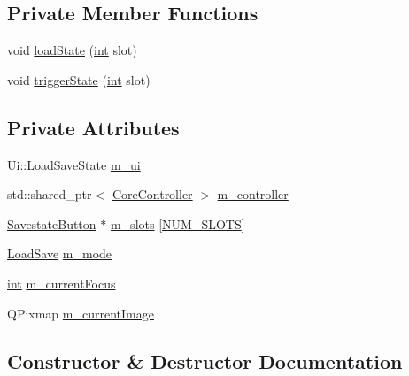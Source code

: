\subsection*{Private Member Functions}
\begin{DoxyCompactItemize}
\item 
void \mbox{\hyperlink{class_q_g_b_a_1_1_load_save_state_a4c71c3b9021b90dc593df29b6aab1676}{load\+State}} (\mbox{\hyperlink{ioapi_8h_a787fa3cf048117ba7123753c1e74fcd6}{int}} slot)
\item 
void \mbox{\hyperlink{class_q_g_b_a_1_1_load_save_state_a489a483482e19018b7f91a345c719d1f}{trigger\+State}} (\mbox{\hyperlink{ioapi_8h_a787fa3cf048117ba7123753c1e74fcd6}{int}} slot)
\end{DoxyCompactItemize}
\subsection*{Private Attributes}
\begin{DoxyCompactItemize}
\item 
Ui\+::\+Load\+Save\+State \mbox{\hyperlink{class_q_g_b_a_1_1_load_save_state_ad1ccc4ae83fef2dd332935b49334fd66}{m\+\_\+ui}}
\item 
std\+::shared\+\_\+ptr$<$ \mbox{\hyperlink{class_q_g_b_a_1_1_core_controller}{Core\+Controller}} $>$ \mbox{\hyperlink{class_q_g_b_a_1_1_load_save_state_a4b9f247016a019ae02a2a4989d1d7ced}{m\+\_\+controller}}
\item 
\mbox{\hyperlink{class_q_g_b_a_1_1_savestate_button}{Savestate\+Button}} $\ast$ \mbox{\hyperlink{class_q_g_b_a_1_1_load_save_state_aabf86fad0d01d46cf6921e69b2aac479}{m\+\_\+slots}} \mbox{[}\mbox{\hyperlink{class_q_g_b_a_1_1_load_save_state_ad3b947d6fb6bbacbc567fe04ffe85e71}{N\+U\+M\+\_\+\+S\+L\+O\+TS}}\mbox{]}
\item 
\mbox{\hyperlink{namespace_q_g_b_a_a7943e4735d6f412e1479e456e6f4aca2}{Load\+Save}} \mbox{\hyperlink{class_q_g_b_a_1_1_load_save_state_a4771ef58b482f3db8c77a1f6d331b158}{m\+\_\+mode}}
\item 
\mbox{\hyperlink{ioapi_8h_a787fa3cf048117ba7123753c1e74fcd6}{int}} \mbox{\hyperlink{class_q_g_b_a_1_1_load_save_state_ac9ecd199dcad21446019354896d3f97d}{m\+\_\+current\+Focus}}
\item 
Q\+Pixmap \mbox{\hyperlink{class_q_g_b_a_1_1_load_save_state_a3ab504b0315e51773e5c9e07d36b8e43}{m\+\_\+current\+Image}}
\end{DoxyCompactItemize}


\subsection{Constructor \& Destructor Documentation}
\mbox{\label{class_q_g_b_a_1_1_load_save_state_a9f873de40c6b36e14eda11ed9ae92581}} 
